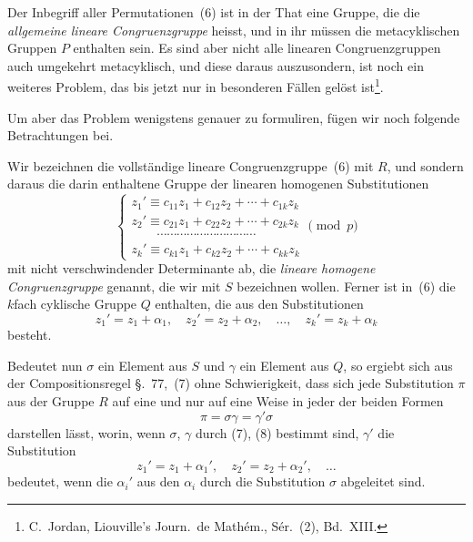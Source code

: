 \documentclass[12pt,a4paper]{article}
\begin{document}
Der Inbegriff aller Permutationen~(6) ist in der That eine Gruppe, die die \emph{allgemeine lineare Congruenzgruppe} heisst, und in ihr m\"ussen die metacyklischen Gruppen $P$ enthalten sein. Es sind aber nicht alle linearen Congruenzgruppen auch umgekehrt metacyklisch, und diese daraus auszusondern, ist noch ein weiteres Problem, das bis jetzt nur in besonderen F\"allen gel\"ost ist\footnote{C.~Jordan, Liouville's Journ.\ de Math\'em., S\'er.~(2), Bd.~XIII.}.

Um aber das Problem wenigstens genauer zu formuliren, f\"ugen wir noch folgende Betrachtungen bei.

Wir bezeichnen die vollst\"andige lineare Congruenzgruppe~(6) mit $R$, und sondern daraus die darin enthaltene Gruppe der linearen homogenen Substitutionen
\begin{equation}
\tag{7}
\begin{cases}
z_1' \equiv c_{11} z_1 + c_{12} z_2 + \cdots + c_{1k} z_k\\
z_2' \equiv c_{21} z_1 + c_{22} z_2 + \cdots + c_{2k} z_k\\
\qquad\cdots\cdots\cdots\cdots\cdots\cdots\cdots\cdots\cdots\cdots\\
z_k' \equiv c_{k1} z_1 + c_{k2} z_2 + \cdots + c_{kk} z_k
\end{cases}
\pmod p
\end{equation}
mit nicht verschwindender Determinante ab, die \emph{lineare homogene Congruenzgruppe} genannt, die wir mit $S$ bezeichnen wollen. Ferner ist in~(6) die $k$fach cyklische Gruppe $Q$ enthalten, die aus den Substitutionen
\begin{equation}
\tag{8}
z_1' = z_1 + \alpha_1,\quad z_2' = z_2 + \alpha_2,\quad\ldots,\quad z_k' = z_k + \alpha_k
\end{equation}
besteht.

Bedeutet nun $\sigma$ ein Element aus $S$ und $\gamma$ ein Element aus $Q$, so ergiebt sich aus der Compositionsregel \S.~77,~(7) ohne Schwierigkeit, dass sich jede Substitution $\pi$ aus der Gruppe $R$ auf eine und nur auf eine Weise in jeder der beiden Formen
\begin{equation}
\tag{9}
\pi = \sigma\gamma = \gamma'\sigma
\end{equation}
darstellen l\"asst, worin, wenn $\sigma$, $\gamma$ durch (7), (8) bestimmt sind, $\gamma'$ die Substitution
\begin{equation}
\tag{10}
z_1' = z_1 + \alpha_1',\quad z_2' = z_2 + \alpha_2',\quad\ldots
\end{equation}
bedeutet, wenn die $\alpha_i'$ aus den $\alpha_i$ durch die Substitution $\sigma$ abgeleitet sind.
\end{document}
